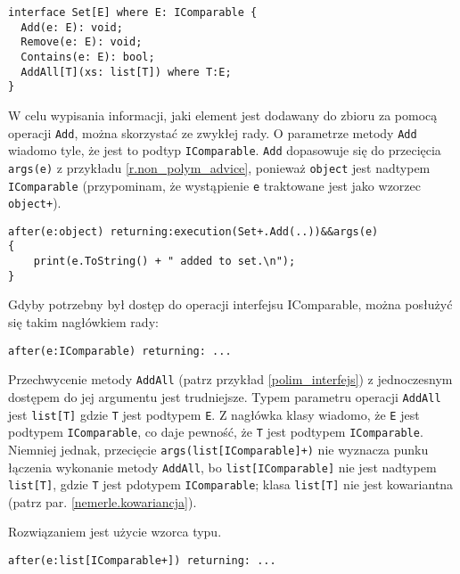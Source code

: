 \documentclass[a4paper,12pt]{mwbk}
\begin{document}
\begin{lstlisting}[style=AspectJ,caption=Interfejs parametryzowalny,label=polim_interfejs]
interface Set[E] where E: IComparable {
  Add(e: E): void;
  Remove(e: E): void;
  Contains(e: E): bool;
  AddAll[T](xs: list[T]) where T:E;
}
\end{lstlisting}

W celu wypisania informacji, jaki element jest dodawany do zbioru za pomocą 
operacji \lstinline!Add!, można skorzystać ze
zwykłej rady. O parametrze metody \lstinline!Add! wiadomo tyle, że jest to podtyp
\lstinline!IComparable!. \lstinline!Add! dopasowuje się do przecięcia
\lstinline!args(e)! z przykładu \ref{r.non_polym_advice}, ponieważ \lstinline!object! jest nadtypem
\lstinline!IComparable! (przypominam, że wystąpienie \lstinline!e! traktowane jest jako wzorzec \lstinline!object+!).

\begin{lstlisting}[style=AspectJ,caption=Rada modyfikująca parametryzowalną metodę,label=r.non_polym_advice]
after(e:object) returning:execution(Set+.Add(..))&&args(e)
{
    print(e.ToString() + " added to set.\n");
}
\end{lstlisting}

Gdyby potrzebny był dostęp do operacji interfejsu IComparable, można
posłużyć się takim nagłówkiem rady:

\begin{lstlisting}[style=AspectJ]
after(e:IComparable) returning: ...
\end{lstlisting}

Przechwycenie metody \lstinline!AddAll! (patrz przykład
\ref{polim_interfejs}) z jednoczesnym dostępem do jej argumentu jest trudniejsze. Typem parametru operacji
\lstinline!AddAll! jest \lstinline!list[T]! gdzie \lstinline!T! jest podtypem
\lstinline!E!. Z nagłówka klasy wiadomo, że \lstinline!E! jest podtypem
\lstinline!IComparable!, co daje pewność, że \lstinline!T! jest podtypem
\lstinline!IComparable!.  Niemniej jednak, przecięcie
\lstinline!args(list[IComparable]+)! nie wyznacza punku łączenia wykonanie metody \lstinline!AddAll!, bo
\lstinline!list[IComparable]! nie jest nadtypem \lstinline!list[T]!, gdzie \lstinline!T! 
jest pdotypem \lstinline!IComparable!;
klasa \lstinline!list[T]! nie jest kowariantna (patrz par. \ref{nemerle.kowariancja}).

Rozwiązaniem jest użycie wzorca typu. 
\begin{lstlisting}[style=AspectJ]
after(e:list[IComparable+]) returning: ...
\end{lstlisting}
\end{document}

